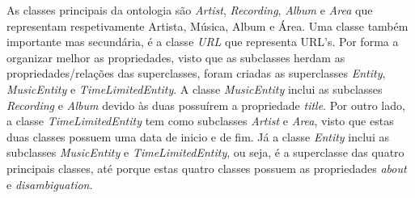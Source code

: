 \documentclass{article}
\begin{document}
As classes principais da ontologia são \textit{Artist}, \textit{Recording}, \textit{Album} e \textit{Area} que representam respetivamente Artista, Música, Album e Área. Uma classe também importante mas secundária, é a classe \textit{URL} que representa URL's. Por forma a organizar melhor as propriedades, visto que as subclasses herdam as propriedades/relações das superclasses, foram criadas as superclasses \textit{Entity}, \textit{MusicEntity} e \textit{TimeLimitedEntity}. A classe \textit{MusicEntity} inclui as subclasses \textit{Recording} e \textit{Album} devido às duas possuírem a propriedade \textit{title}. Por outro lado, a classe \textit{TimeLimitedEntity} tem como subclasses \textit{Artist} e \textit{Area}, visto que estas duas classes possuem uma data de inicio e de fim. Já a classe \textit{Entity} inclui as subclasses \textit{MusicEntity} e \textit{TimeLimitedEntity}, ou seja, é a superclasse das quatro principais classes, até porque estas quatro classes possuem as propriedades \textit{about} e \textit{disambiguation}.
\end{document}
